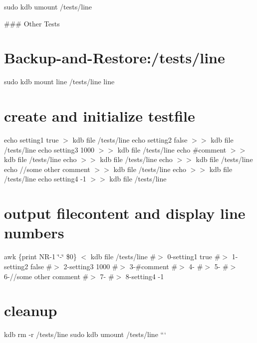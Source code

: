 sudo kdb umount /tests/line 
\begin{DoxyCode}
### Other Tests
\end{DoxyCode}
 \hypertarget{autotoc_md374_autotoc_md380}{}\section{Backup-\/and-\/\+Restore\+:/tests/line}\label{autotoc_md374_autotoc_md380}
sudo kdb mount line /tests/line line\hypertarget{autotoc_md374_autotoc_md381}{}\section{create and initialize testfile}\label{autotoc_md374_autotoc_md381}
echo \textquotesingle{}setting1 true\textquotesingle{} $>$ {\ttfamily kdb file /tests/line} echo \textquotesingle{}setting2 false\textquotesingle{} $>$$>$ {\ttfamily kdb file /tests/line} echo \textquotesingle{}setting3 1000\textquotesingle{} $>$$>$ {\ttfamily kdb file /tests/line} echo \textquotesingle{}\#comment\textquotesingle{} $>$$>$ {\ttfamily kdb file /tests/line} echo $>$$>$ {\ttfamily kdb file /tests/line} echo $>$$>$ {\ttfamily kdb file /tests/line} echo \textquotesingle{}//some other comment\textquotesingle{} $>$$>$ {\ttfamily kdb file /tests/line} echo $>$$>$ {\ttfamily kdb file /tests/line} echo \textquotesingle{}setting4 -\/1\textquotesingle{} $>$$>$ {\ttfamily kdb file /tests/line}\hypertarget{autotoc_md374_autotoc_md382}{}\section{output filecontent and display line numbers}\label{autotoc_md374_autotoc_md382}
awk \textquotesingle{}\{print N\+R-\/1 \char`\"{}-\/\char`\"{} \$0\}\textquotesingle{} $<$ {\ttfamily kdb file /tests/line} \#$>$ 0-\/setting1 true \#$>$ 1-\/setting2 false \#$>$ 2-\/setting3 1000 \#$>$ 3-\/\#comment \#$>$ 4-\/ \#$>$ 5-\/ \#$>$ 6-\///some other comment \#$>$ 7-\/ \#$>$ 8-\/setting4 -\/1\hypertarget{autotoc_md374_autotoc_md383}{}\section{cleanup}\label{autotoc_md374_autotoc_md383}
kdb rm -\/r /tests/line sudo kdb umount /tests/line ``` 